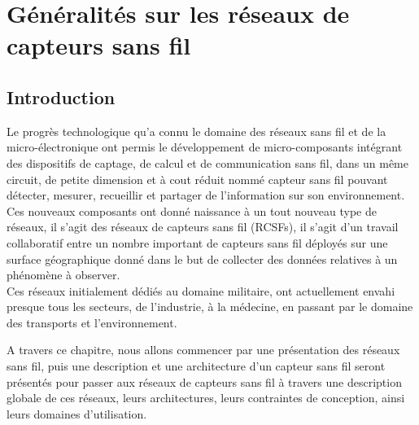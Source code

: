 \chapter{Généralités sur les réseaux de capteurs sans fil}
\section{Introduction}
        Le progrès technologique qu'a connu le domaine des réseaux sans fil et de la micro-électronique ont permis le développement de micro-composants intégrant des dispositifs de captage, de calcul et de communication sans fil, dans un même circuit, de petite dimension et à cout réduit nommé capteur sans fil pouvant détecter, mesurer, recueillir et partager de l'information sur son environnement.\\
         Ces nouveaux composants  ont donné naissance à un tout nouveau type de réseaux, il s'agit des réseaux de capteurs sans fil (RCSFs), il s'agit d'un travail collaboratif entre un nombre important de capteurs sans fil déployés sur une surface géographique donné dans le but de collecter des données relatives à un phénomène à observer.  \\
         Ces réseaux initialement dédiés au domaine militaire, ont actuellement envahi presque tous les secteurs,  de l'industrie, à la médecine, en passant par le domaine des transports et l'environnement.
        
        
     A travers ce chapitre, nous allons commencer par une présentation des réseaux sans fil, puis une description et une architecture d'un capteur sans fil seront présentés pour passer aux réseaux de capteurs sans fil à travers  une description globale de ces réseaux, leurs architectures, leurs contraintes de conception, ainsi leurs domaines d'utilisation.
        
